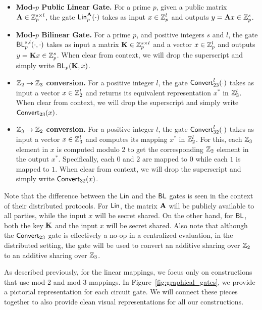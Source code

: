 \begin{itemize}
    \item \textbf{Mod-$p$ Public Linear Gate.}
    For a prime $p$, given a public matrix $\mat{A} \in \Z_p^{s \times l}$, the gate $\LMap^\mat{A}_p(\cdot)$ takes as input $x \in \mathbb{Z}_p^l$ and outputs $y = \mat{A}x \in \Z_p^s$.

    \item \textbf{Mod-$p$ Bilinear Gate.}
    For a prime $p$, and positive integers $s$ and $l$, the gate $\textsf{BL}_p^{s,l}(\cdot, \cdot)$ takes as input a matrix $\mat{K} \in \Z_p^{s \times l}$ and a vector $x \in \mathbb{Z}_p^l$ and outputs $y = \mat{K}x \in \Z_p^s$. When clear from context, we will drop the superscript and simply write $\BLMap_p(\mat{K}, x)$.
    
    \item \textbf{$\mathbb{Z}_2 \to \mathbb{Z}_3$ conversion.} For a positive integer $l$, the gate $\textsf{Convert}^l_{23}(\cdot)$ takes as input a vector $x \in \mathbb{Z}_2^l$ and returns its equivalent representation $x^*$ in $\mathbb{Z}_3^l$. When clear from context, we will drop the superscript and simply write $\textsf{Convert}_{23}(x)$.

    \item \textbf{$\mathbb{Z}_3 \to \mathbb{Z}_2$ conversion.} For a positive integer $l$, the gate $\textsf{Convert}^l_{32}(\cdot)$ takes as input a vector $x \in \mathbb{Z}_3^l$ and computes its mapping $x^*$ in $\mathbb{Z}_2^l$. For this, each $\mathbb{Z}_3$ element in $x$ is computed modulo 2 to get the corresponding $\mathbb{Z}_2$ element in the output $x^*$. Specifically, each $0$ and $2$ are mapped to $0$ while each $1$ is mapped to $1$. When clear from context, we will drop the superscript and simply write $\textsf{Convert}_{32}(x)$.
\end{itemize}

\noindent Note that the difference between the $\textsf{Lin}$ and the $\textsf{BL}$ gates is seen in the context of their distributed protocols. For $\textsf{Lin}$, the matrix $\mat{A}$ will be publicly available to all parties, while the input $x$ will be secret shared. On the other hand, for $\textsf{BL}$, both the key $\mat{K}$ and the input $x$ will be secret shared. Also note that although the $\textsf{Convert}_{23}$ gate is effectively a no-op in a centralized evaluation, in the distributed setting, the gate will be used to convert an additive sharing over $\mathbb{Z}_2$ to an additive sharing over $\mathbb{Z}_3$.

As described previously, for the linear mappings, we focus only on constructions that use mod-2 and mod-3 mappings. In Figure~\ref{fig:graphical_gates}, we provide a pictorial representation for each circuit gate. We will connect these pieces together to also provide clean visual representations for all our constructions. 

